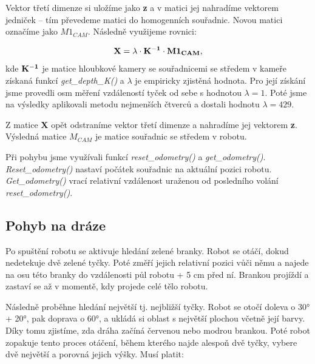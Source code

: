 \documentclass{article}
\begin{document}
	Vektor třetí dimenze si uložíme jako {\bf z} a v matici jej nahradíme vektorem jedniček -- tím převedeme matici do homogenních souřadnic. Novou matici označíme jako {\bf $M1_{CAM}$}. Následně využijeme rovnici:

\begin{equation}
	{\bf X} = \lambda \cdot {\bf K^{-1}} \cdot {\bf M1_{CAM}},
\end{equation}
	kde ${\bf K^{-1}}$ je matice hloubkové kamery se souřadnicemi se středem v kameře získaná funkcí {\it get\_depth\_K()} a $\lambda$ je empiricky zjistěná hodnota. Pro její získání jsme provedli osm měření vzdáleností tyček od sebe s hodnotou $\lambda = 1$. Poté jsme na výsledky aplikovali metodu nejmenších čtverců a dostali hodnotu $\lambda = 429$. 
	
	Z matice {\bf X} opět odstraníme vektor třetí dimenze a nahradíme jej vektorem {\bf z}. Výsledná matice {\bf  $M_{CAM}$} je matice souřadnic se středem v robotu. 
	
	Při pohybu jsme využívali funkcí {\it reset\_odometry()} a {\it get\_odometry()}. {\it Reset\_odometry()} nastaví počátek souřadnic na aktuální pozici robotu. {\it Get\_odometry()} vrací relativní vzdálenost uraženou od posledního volání {\it reset\_odometry()}. 

\subsection{Pohyb na dráze}

	


	
	Po spuštění robotu se aktivuje hledání zelené branky. Robot se otáčí, dokud nedetekuje dvě zelené tyčky. Poté změří jejich relativní pozici vůči němu a najede na osu této branky do vzdálenosti půl robotu + 5 cm před ní. Brankou projíždí a zastaví se až v momentě, kdy projede celé tělo robotu. 
	
	Následně proběhne hledání největší tj. nejbližší tyčky. Robot se otočí doleva o 30° + 20°, pak doprava o 60°, a ukládá si oblast s největší plochou včetně její barvy. Díky tomu zjistíme, zda dráha začíná červenou nebo modrou brankou. Poté robot zopakuje tento proces otáčení, během kterého najde alespoň dvě tyčky, vybere dvě největší a porovná jejich výšky. Musí platit:
	
\end{document}
